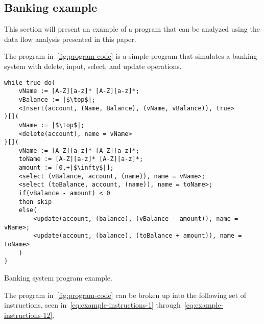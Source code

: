 \subsection{Banking example}\label{subsec:banking-example}
This section will present an example of a program that can be analyzed using the data flow analysis presented in this paper.

The program in~\autoref{fig:program-code} is a simple program that simulates a banking system with delete, input, select, and update operations.

\begin{listing}
    \begin{verbatim}
while true do(
    vName := [A-Z][a-z]* [A-Z][a-z]*;
    vBalance := |$\top$|;
    <Insert(account, (Name, Balance), (vName, vBalance)), true>
)[](
    vName := |$\top$|;
    <delete(account), name = vName>
)[](
    vName := [A-Z][a-z]* [A-Z][a-z]*;
    toName := [A-Z][a-z]* [A-Z][a-z]*;
    amount := [0,+|$\infty$|];
    <select (vBalance, account, (name)), name = vName>;
    <select (toBalance, account, (name)), name = toName>;
    if(vBalance - amount) < 0
    then skip
    else(
        <update(account, (balance), (vBalance - amount)), name = vName>;
        <update(account, (balance), (toBalance + amount)), name = toName>
    )
)
    \end{verbatim}
    \caption{Banking system program example.}
    \label{fig:program-code}
\end{listing}

The program in~\autoref{fig:program-code} can be broken up into the following set of instructions, seen in~\autoref{eq:example-instructions-1} through~\autoref{eq:example-instructions-12}.


